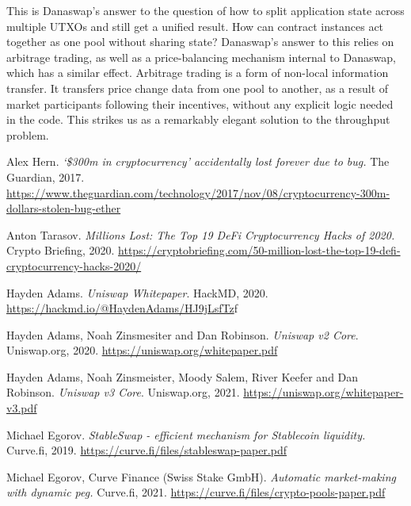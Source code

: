 \documentclass[12pt]{article}
\begin{document}
This is Danaswap's answer to the question of how to split application state across multiple UTXOs and still get a unified result. How can
contract instances act together as one pool without sharing state? Danaswap's answer to this relies on arbitrage trading, as well as a price-balancing
mechanism internal to Danaswap, which has a similar effect. Arbitrage trading is a form of non-local information transfer.
It transfers price change data from one pool to another, as a result of market participants following their incentives, without any
explicit logic needed in the code. This strikes us as a remarkably elegant solution to the throughput problem.

\begin{thebibliography}{9}

	Alex Hern. \textit{`\$300m in cryptocurrency' accidentally lost forever due to bug.} The Guardian, 2017. \url{https://www.theguardian.com/technology/2017/nov/08/cryptocurrency-300m-dollars-stolen-bug-ether}


	Anton Tarasov. \textit{Millions Lost: The Top 19 DeFi Cryptocurrency Hacks of 2020.} Crypto Briefing, 2020. \url{https://cryptobriefing.com/50-million-lost-the-top-19-defi-cryptocurrency-hacks-2020/}

	Hayden Adams. \textit{Uniswap Whitepaper}. HackMD, 2020. \url{https://hackmd.io/@HaydenAdams/HJ9jLsfTz}f

 Hayden Adams, Noah Zinsmesiter and Dan Robinson. \textit{Uniswap v2 Core}. Uniswap.org, 2020. \url{https://uniswap.org/whitepaper.pdf}

 Hayden Adams, Noah Zinsmeister, Moody Salem, River Keefer and Dan Robinson. \textit{Uniswap v3 Core}. Uniswap.org, 2021. \url{https://uniswap.org/whitepaper-v3.pdf}

 Michael Egorov. \textit{StableSwap - efficient mechanism for Stablecoin liquidity.} Curve.fi, 2019. \url{https://curve.fi/files/stableswap-paper.pdf}

 Michael Egorov, Curve Finance (Swiss Stake GmbH). \textit{Automatic market-making with dynamic peg.} Curve.fi, 2021. \url{https://curve.fi/files/crypto-pools-paper.pdf}

\end{thebibliography}
\end{document}
